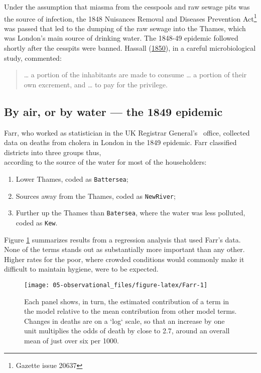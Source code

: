\documentclass[
  10ptls,
  b5paper]{book}
\providecommand{\tightlist}{%
  \setlength{\itemsep}{0pt}\setlength{\parskip}{0pt}}
\begin{document}
Under the assumption that miasma from the cesspools and raw sewage pits was the source of infection, the 1848 Nuisances Removal and Diseases Prevention Act\footnote{Gazette issue 20637} was passed that led to the dumping of the raw sewage into the Thames, which was London's main source of drinking water. The 1848-49 epidemic followed shortly after the cesspits were banned. Hassall (\protect\hyperlink{ref-hassall1850memoir}{1850}), in a careful microbiological study, commented:

\begin{quote}
\ldots{} a portion of the inhabitants are made to consume \ldots{} a portion of their own excrement, and \ldots{} to pay for the privilege.
\end{quote}

\hypertarget{by-air-or-by-water-the-1849-epidemic}{%
\subsection*{By air, or by water --- the 1849 epidemic}\label{by-air-or-by-water-the-1849-epidemic}}

Farr, who worked as statistician in the UK Registrar General's~ office, collected data on deaths from cholera in London in the 1849 epidemic. Farr classified districts into three groups thus,\\
according to the source of the water for most of the householders:

\begin{enumerate}
\def\labelenumi{\arabic{enumi})}
\tightlist
\item
  Lower Thames, coded as \texttt{Battersea};\\
\item
  Sources away from the Thames, coded as \texttt{NewRiver};\\
\item
  Further up the Thames than \texttt{Batersea}, where the water was less polluted, coded as \texttt{Kew}.
\end{enumerate}

Figure \ref{fig:Farr} summarizes results from a regression analysis that used Farr's data. None of the terms stands out as substantially more important than any other. Higher rates for the poor, where crowded conditions would commonly make it difficult to maintain hygiene, were to be expected.

\begin{figure}

{\centering \texttt{[image: 05-observational\_files/figure-latex/Farr-1]} 

}

\caption{Each panel shows, in turn, the estimated contribution
of a term in the model relative to the mean contribution from 
other model terms. Changes in deaths are on a `log` scale, so 
that an increase by one unit multiplies the odds of death by 
close to 2.7, around an overall mean of just over six per 1000.
}\label{fig:Farr}
\end{figure}
\end{document}

